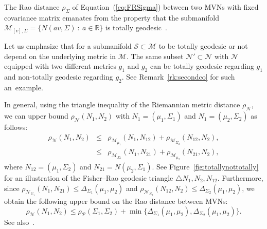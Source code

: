 \documentclass[entropy,article,accept,oneauthor,pdftex,entropy]{Definitions/mdpi}
\def\calS{\mathcal{S}}
\def\calM{\mathcal{M}}
\def\bbR{\mathbb{R}}
\def\calN{\mathcal{N}}
\def\st{\ :\ }
\def\bbR{\mathbb{R}}
\begin{document}
The Rao distance $\rho_\Sigma$ of Equation~(\ref{eq:FRSigma}) between two MVNs with fixed covariance matrix emanates from the property that the submanifold 
$\calM_{[v],\Sigma}=\{N(a v,\Sigma) \st a\in\bbR\}$ is totally geodesic~\cite{strapasson2016totally}.

Let us emphasize that for a submanifold $\calS\subset\calM$ to be totally geodesic or not depend on the underlying metric in $\calM$. 
The same subset $\calN'\subset\calN$ with $\calN$ equipped with two different metrics $g_1$ and $g_2$ can be totally geodesic regarding $g_1$ and non-totally geodesic regarding $g_2$. See Remark~\ref{rk:secondco} for such an~example.



In general, using the triangle inequality of the Riemannian metric distance $\rho_\calN$, we can upper bound $\rho_\calN(N_1,N_2)$ with $N_1=(\mu_1,\Sigma_1)$ and $N_1=(\mu_2,\Sigma_2)$  as follows:
\begin{eqnarray*}
\rho_\calN(N_1,N_2)&\leq& \rho_{\calM_{\mu_1}}(N_1,N_{12})+\rho_{\calM_{\Sigma_2}}(N_{12},N_2),\\
&\leq& \rho_{\calM_{\Sigma_1}}(N_1,N_{21})+\rho_{\calM_{\mu_2}}(N_{21},N_2),
\end{eqnarray*}
where $N_{12}=(\mu_1,\Sigma_2)$ and $N_{21}=N(\mu_2,\Sigma_1)$.
See Figure~\ref{fig:totallynottotally} for an illustration of the Fisher--Rao geodesic triangle $\triangle N_1,N_2,N_{12}$.
Furthermore, since $\rho_{\calN_{\Sigma_1}}(N_1,N_{21})\leq\Delta_{\Sigma_1}(\mu_1,\mu_2)$ and 
$\rho_{\calN_{\Sigma_2}}(N_{12},N_2)\leq \Delta_{\Sigma_2}(\mu_1,\mu_2)$, we obtain the following upper bound on the Rao distance between MVNs:
\begin{equation}\label{eq:UBMah}
\rho_{\mathcal{N}}(N_1,N_2)\leq \rho_{\mathcal{P}}(\Sigma_1,\Sigma_2)+\min\{\Delta_{\Sigma_1}(\mu_1,\mu_2),\Delta_{\Sigma_2}(\mu_1,\mu_2)\}.
\end{equation}
See also~\cite{chen2022multisensor}. 
\end{document}
